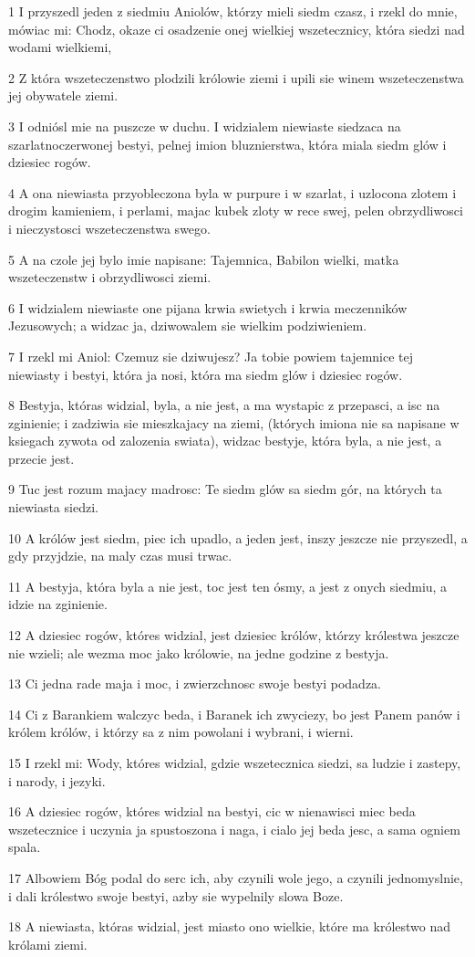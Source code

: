 \par 1 I przyszedl jeden z siedmiu Aniolów, którzy mieli siedm czasz, i rzekl do mnie, mówiac mi: Chodz, okaze ci osadzenie onej wielkiej wszetecznicy, która siedzi nad wodami wielkiemi,
\par 2 Z która wszeteczenstwo plodzili królowie ziemi i upili sie winem wszeteczenstwa jej obywatele ziemi.
\par 3 I odniósl mie na puszcze w duchu. I widzialem niewiaste siedzaca na szarlatnoczerwonej bestyi, pelnej imion bluznierstwa, która miala siedm glów i dziesiec rogów.
\par 4 A ona niewiasta przyobleczona byla w purpure i w szarlat, i uzlocona zlotem i drogim kamieniem, i perlami, majac kubek zloty w rece swej, pelen obrzydliwosci i nieczystosci wszeteczenstwa swego.
\par 5 A na czole jej bylo imie napisane: Tajemnica, Babilon wielki, matka wszeteczenstw i obrzydliwosci ziemi.
\par 6 I widzialem niewiaste one pijana krwia swietych i krwia meczenników Jezusowych; a widzac ja, dziwowalem sie wielkim podziwieniem.
\par 7 I rzekl mi Aniol: Czemuz sie dziwujesz? Ja tobie powiem tajemnice tej niewiasty i bestyi, która ja nosi, która ma siedm glów i dziesiec rogów.
\par 8 Bestyja, któras widzial, byla, a nie jest, a ma wystapic z przepasci, a isc na zginienie; i zadziwia sie mieszkajacy na ziemi, (których imiona nie sa napisane w ksiegach zywota od zalozenia swiata), widzac bestyje, która byla, a nie jest, a przecie jest.
\par 9 Tuc jest rozum majacy madrosc: Te siedm glów sa siedm gór, na których ta niewiasta siedzi.
\par 10 A królów jest siedm, piec ich upadlo, a jeden jest, inszy jeszcze nie przyszedl, a gdy przyjdzie, na maly czas musi trwac.
\par 11 A bestyja, która byla a nie jest, toc jest ten ósmy, a jest z onych siedmiu, a idzie na zginienie.
\par 12 A dziesiec rogów, któres widzial, jest dziesiec królów, którzy królestwa jeszcze nie wzieli; ale wezma moc jako królowie, na jedne godzine z bestyja.
\par 13 Ci jedna rade maja i moc, i zwierzchnosc swoje bestyi podadza.
\par 14 Ci z Barankiem walczyc beda, i Baranek ich zwyciezy, bo jest Panem panów i królem królów, i którzy sa z nim powolani i wybrani, i wierni.
\par 15 I rzekl mi: Wody, któres widzial, gdzie wszetecznica siedzi, sa ludzie i zastepy, i narody, i jezyki.
\par 16 A dziesiec rogów, któres widzial na bestyi, cic w nienawisci miec beda wszetecznice i uczynia ja spustoszona i naga, i cialo jej beda jesc, a sama ogniem spala.
\par 17 Albowiem Bóg podal do serc ich, aby czynili wole jego, a czynili jednomyslnie, i dali królestwo swoje bestyi, azby sie wypelnily slowa Boze.
\par 18 A niewiasta, któras widzial, jest miasto ono wielkie, które ma królestwo nad królami ziemi.

